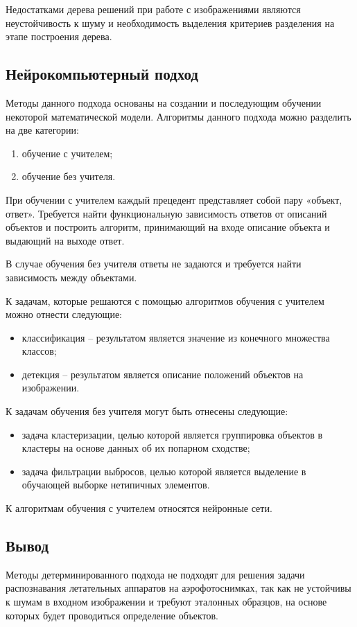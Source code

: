 Недостатками дерева решений при работе с изображениями являются неустойчивость к шуму и необходимость выделения критериев разделения на этапе построения дерева.

\subsection{Нейрокомпьютерный подход}\label{sec:neuro}

Методы данного подхода основаны на создании и последующим обучении некоторой математической модели. Алгоритмы данного подхода можно разделить на две категории:
\begin{enumerate}
	\item обучение с учителем;
	\item обучение без учителя.
\end{enumerate}

При обучении с учителем каждый прецедент представляет собой пару «объект, ответ». Требуется найти функциональную зависимость ответов от описаний объектов и построить алгоритм, принимающий на входе описание объекта и выдающий на выходе ответ.

В случае обучения без учителя ответы не задаются и требуется найти зависимость между объектами.

К задачам, которые решаются с помощью алгоритмов обучения с учителем можно отнести следующие:
\begin{itemize}
	\item классификация -- результатом является значение из конечного множества классов;
	\item детекция -- результатом является описание положений объектов на изображении.
\end{itemize}

К задачам обучения без учителя могут быть отнесены следующие:
\begin{itemize}
	\item задача кластеризации, целью которой является группировка объектов в кластеры на основе данных об их попарном сходстве;
	\item задача фильтрации выбросов, целью которой является выделение в обучающей выборке нетипичных элементов.
\end{itemize}

К алгоритмам обучения с учителем относятся нейронные сети.

\subsection{Вывод}
Методы детерминированного подхода не подходят для решения задачи распознавания летательных аппаратов на аэрофотоснимках, так как не устойчивы к шумам в входном изображении и требуют эталонных образцов, на основе которых будет проводиться определение объектов.

